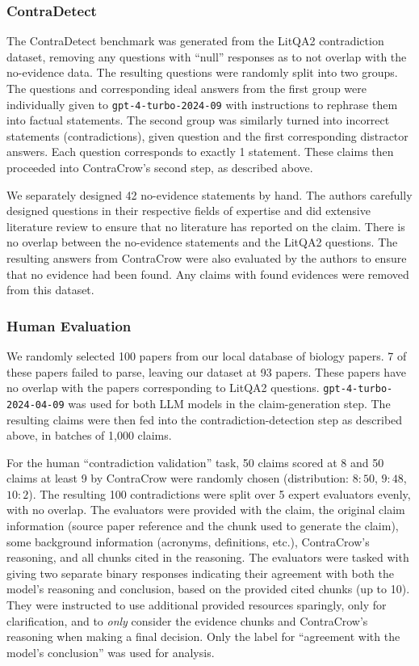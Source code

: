 \subsubsection{ContraDetect} \label{sec:cc-contradetect}
The ContraDetect benchmark was generated from the LitQA2 contradiction dataset, removing any questions with ``null'' responses as to not overlap with the no-evidence data. The resulting questions were randomly split into two groups. The questions and corresponding ideal answers from the first group were individually given to \texttt{gpt-4-turbo-2024-09}\cite{achiam2023gpt} with instructions to rephrase them into factual statements. The second group was similarly turned into incorrect statements (contradictions), given question and the first corresponding distractor answers. Each question corresponds to exactly 1 statement. These claims then proceeded into ContraCrow's second step, as described above.

We separately designed 42 no-evidence statements by hand. The authors carefully designed questions in their respective fields of expertise and did extensive literature review to ensure that no literature has reported on the claim. There is no overlap between the no-evidence statements and the LitQA2 questions. The resulting answers from ContraCrow were also evaluated by the authors to ensure that no evidence had been found. Any claims with found evidences were removed from this dataset. 

\subsubsection{Human Evaluation} \label{sec:cc-eval}
We randomly selected 100 papers from our local database of biology papers. 7 of these papers failed to parse, leaving our dataset at 93 papers. These papers have no overlap with the papers corresponding to LitQA2 questions. \texttt{gpt-4-turbo-2024-04-09}\cite{achiam2023gpt} was used for both LLM models in the claim-generation step. The resulting claims were then fed into the contradiction-detection step as described above, in batches of 1,000 claims.

For the human ``contradiction validation'' task, 50 claims scored at 8 and 50 claims at least 9 by ContraCrow were randomly chosen (distribution: $8:50$, $9:48$, $10:2$). The resulting 100 contradictions were split over 5 expert evaluators evenly, with no overlap. The evaluators were provided with the claim, the original claim information (source paper reference and the chunk used to generate the claim), some background information (acronyms, definitions, etc.), ContraCrow's reasoning, and all chunks cited in the reasoning. The evaluators were tasked with giving two separate binary responses indicating their agreement with both the model's reasoning and conclusion, based on the provided cited chunks (up to 10). They were instructed to use additional provided resources sparingly, only for clarification, and to \textit{only} consider the evidence chunks and ContraCrow's reasoning when making a final decision. Only the label for ``agreement with the model's conclusion'' was used for analysis. 

